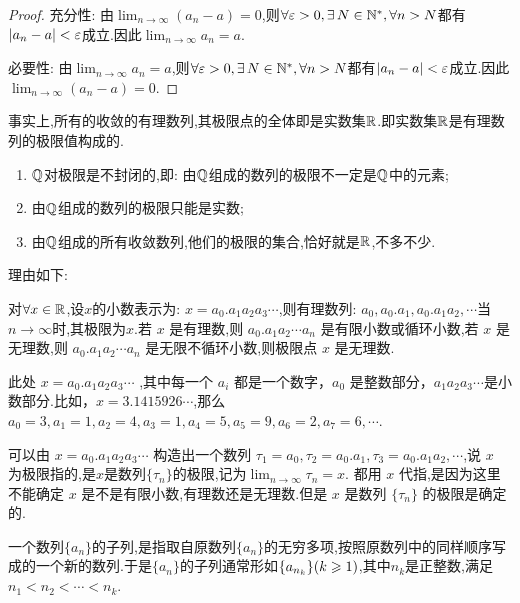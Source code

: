 \begin{proof}
    充分性: 由$\lim_{n \to \infty} (a_n - a) = 0$,则$\forall \ve > 0, \exists N \in \mathbb{N}^*, \forall n > N$都有$|a_n - a| < \varepsilon$成立.因此$\lim_{n \to \infty} a_n = a$.

    必要性: 由$\lim_{n \to \infty} a_n = a$,则$\forall \ve > 0, \exists N \in \mathbb{N}^*, \forall n > N$都有$|a_n - a| < \varepsilon$成立.因此$\lim_{n \to \infty} (a_n - a) = 0$.
\end{proof}

事实上,所有的收敛的有理数列,其极限点的全体即是实数集$\mathbb{R}$.即实数集$\mathbb{R}$是有理数列的极限值构成的.

\begin{remark}
    \begin{enumerate}
        \item $\mathbb{Q}$对极限是不封闭的,即: 由$\mathbb{Q}$组成的数列的极限不一定是$\mathbb{Q}$中的元素;
        \item 由$\mathbb{Q}$组成的数列的极限只能是实数;
        \item 由$\mathbb{Q}$组成的所有收敛数列,他们的极限的集合,恰好就是$\mathbb{R}$,不多不少.
    \end{enumerate}

    理由如下:

    对$\forall x\in \mathbb{R}$,设$x$的小数表示为: $x=a_0 . a_1 a_2 a_3 \cdots$,则有理数列: $a_0, a_0 . a_1, a_0 . a_1 a_2, \cdots$当$n\rightarrow \infty$时,其极限为$x$.若 $x$ 是有理数,则 $a_0 . a_1 a_2 \cdots a_n$ 是有限小数或循环小数,若 $x$ 是无理数,则 $a_0 . a_1 a_2 \cdots a_n$ 是无限不循环小数,则极限点 $x$ 是无理数.

    此处 $x=a_0 . a_1 a_2 a_3 \cdots$ ,其中每一个 $a_i$ 都是一个数字，$a_0$ 是整数部分，$a_1 a_2 a_3 \cdots$是小数部分.比如，$x=3.1415926\cdots$,那么 $a_0=3, a_1=1, a_2=4, a_3=1, a_4=5, a_5=9, a_6=2, a_7=6,\cdots$.

    可以由 $x=a_0 . a_1 a_2 a_3 \cdots$ 构造出一个数列 $\tau_1 = a_0, \tau_2 = a_0 . a_1, \tau_3 = a_0 . a_1 a_2, \cdots$,说 $x$ 为极限指的,是$x$是数列$\{\tau_n\}$的极限,记为$\lim_{n \to \infty} \tau_n = x$.
    都用 $x$ 代指,是因为这里不能确定 $x$ 是不是有限小数,有理数还是无理数.但是 $x$ 是数列 $\{\tau_n\}$ 的极限是确定的.

\end{remark}

\begin{definition}
    [子列]

    一个数列$\{a_n\}$的子列,是指取自原数列$\{a_n\}$的无穷多项,按照原数列中的同样顺序写成的一个新的数列.于是$\{a_n\}$的子列通常形如$\{a_{n_k}\} (k \geqslant 1)$,其中$n_k$是正整数,满足$n_1 < n_2 < \cdots < n_k$.
\end{definition}

